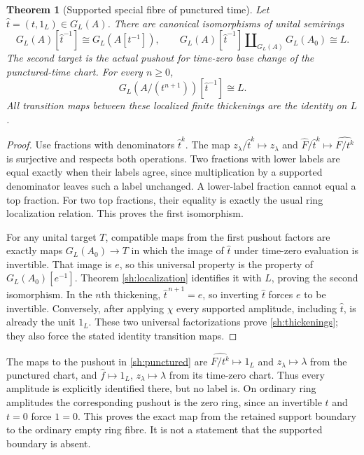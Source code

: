 \documentclass[11pt,a4paper]{article}
\newtheorem{theorem}{Theorem}[section]
\theoremstyle{definition}\newtheorem{definition}[theorem]{Definition}
\begin{document}
\begin{theorem}[Supported special fibre of punctured time]
\label{sh:puncture}
Let $\widehat t=(t,1_L)\in G_L(A)$. There are canonical
isomorphisms of unital semirings
\begin{equation}\tag{SH28}\label{sh:punctured}
 G_L(A)[\widehat t^{-1}]\cong G_L(A[t^{-1}]),\qquad
 G_L(A)[\widehat t^{-1}]
       \amalg_{G_L(A)}G_L(A_0)\cong L.
\end{equation}
The second target is the actual pushout for time-zero base
change of the punctured-time chart. For every $n\ge0$,
\begin{equation}\tag{SH29}\label{sh:thickenings}
 G_L(A/(t^{n+1}))[\widehat t^{-1}]\cong L.
\end{equation}
All transition maps between these localized finite thickenings
are the identity on $L$.
\end{theorem}
\begin{proof}
Use fractions with denominators $\widehat t^k$. The map
$z_\lambda/\widehat t^k\mapsto z_\lambda$ and
$\widehat F/\widehat t^k\mapsto\widehat{F/t^k}$
is surjective and respects both operations. Two fractions with
lower labels are equal exactly when their labels agree, since
multiplication by a supported denominator leaves such a label
unchanged. A lower-label fraction cannot equal a top fraction.
For two top fractions, their equality is exactly the usual ring
localization relation. This proves the first isomorphism.

For any unital target $T$, compatible maps from the first
pushout factors are exactly maps $G_L(A_0)\to T$ in which
the image of $\widehat t$ under time-zero evaluation is
invertible. That image is $e$, so this universal property is
the property of $G_L(A_0)[e^{-1}]$. Theorem
\ref{sh:localization} identifies it with $L$, proving the second
isomorphism. In the $n$th thickening,
$\widehat t^{\,n+1}=e$, so inverting $\widehat t$ forces
$e$ to be invertible. Conversely, after applying $\chi$ every
supported amplitude, including $\widehat t$, is already the
unit $1_L$. These two universal factorizations prove
\eqref{sh:thickenings}; they also force the stated identity
transition maps.
\end{proof}

The maps to the pushout in \eqref{sh:punctured} are
$\widehat{F/t^k}\mapsto1_L$ and
$z_\lambda\mapsto\lambda$ from the punctured chart, and
$\widehat f\mapsto1_L$, $z_\lambda\mapsto\lambda$ from its
time-zero chart. Thus every amplitude is explicitly identified
there, but no label is. On ordinary ring amplitudes the
corresponding pushout is the zero ring, since an invertible
$t$ and $t=0$ force $1=0$. This proves the exact map from
the retained support boundary to the ordinary empty ring fibre.
It is not a statement that the supported boundary is absent.
\end{document}
